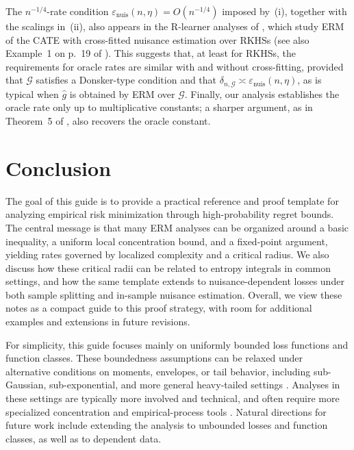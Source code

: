 \documentclass[11pt]{article}
\theoremstyle{plain}
\theoremstyle{definition} %
\begin{document}
The \(n^{-1/4}\)-rate condition \(\varepsilon_{\mathrm{nuis}}(n,\eta)=O(n^{-1/4})\) imposed by~(i), together with the scalings in~(ii), also appears in the R-learner analyses of \citet{nie2021quasi}, which study ERM of the CATE with cross-fitted nuisance estimation over RKHSs (see also Example~1 on p.~19 of \cite{foster2023orthogonal}). This suggests that, at least for RKHSs, the requirements for oracle rates are similar with and without cross-fitting, provided that \(\mathcal G\) satisfies a Donsker-type condition and that \(\delta_{n,\mathcal G}\asymp \varepsilon_{\mathrm{nuis}}(n,\eta)\), as is typical when \(\hat g\) is obtained by ERM over \(\mathcal G\). Finally, our analysis establishes the oracle rate only up to multiplicative constants; a sharper argument, as in Theorem~5 of \citet{van2024combining}, also recovers the oracle constant.

\section{Conclusion}

The goal of this guide is to provide a practical reference and proof template for analyzing empirical risk minimization through high-probability regret bounds. The central message is that many ERM analyses can be organized around a basic inequality, a uniform local concentration bound, and a fixed-point argument, yielding rates governed by localized complexity and a critical radius. We also discuss how these critical radii can be related to entropy integrals in common settings, and how the same template extends to nuisance-dependent losses under both sample splitting and in-sample nuisance estimation. Overall, we view these notes as a compact guide to this proof strategy, with room for additional examples and extensions in future revisions.

For simplicity, this guide focuses mainly on uniformly bounded loss functions and function classes. These boundedness assumptions can be relaxed under alternative conditions on moments, envelopes, or tail behavior, including sub-Gaussian, sub-exponential, and more general heavy-tailed settings
\citep{van1996weak,lecue2012general,bibaut2019fast,grunwald2020fast}. Analyses in these settings are typically more involved and technical, and often require more specialized concentration and empirical-process tools
\citep{chernozhukov2014gaussian,balazs2016chaining,wainwright2019high}. Natural directions for future work include extending the analysis to unbounded losses and function classes, as well as to dependent data.
\end{document}
